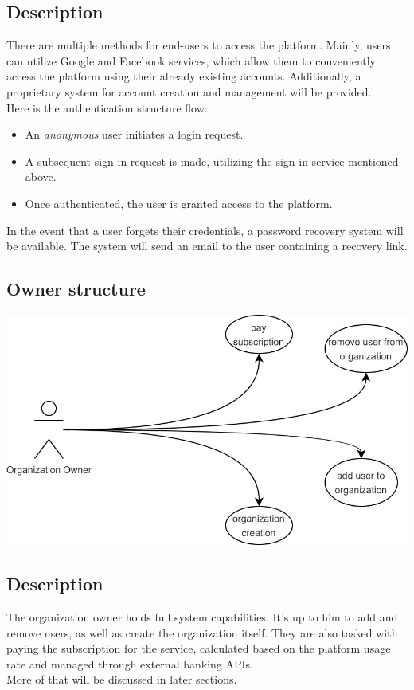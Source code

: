 \documentclass{article}
\begin{document}
\subsection*{Description}
There are multiple methods for end-users to access the platform. Mainly, users can utilize Google and Facebook services, which allow them to conveniently access the platform using their already existing accounts. Additionally, a proprietary system for account creation and management will be provided.\\
Here is the authentication structure flow:
\begin{itemize}
    \item  An \textit{anonymous} user initiates a login request.
    \item A subsequent sign-in request is made, utilizing the sign-in service mentioned above.
    \item  Once authenticated, the user is granted access to the platform.
\end{itemize}
In the event that a user forgets their credentials, a password recovery system will be available. The system will send an email to the user containing a recovery link.
\subsection{Owner structure}
\includegraphics[width=\textwidth, keepaspectratio]{images/UseCaseDiagram/UseCaseOwner.jpg}
\subsection*{Description}
The organization owner holds full system capabilities. It's up to him to add and remove users, as well as create the organization itself. They are also tasked with paying the subscription for the service, calculated based on the platform usage rate and managed through external banking APIs.\\
More of that will be discussed in later sections.
\end{document}
